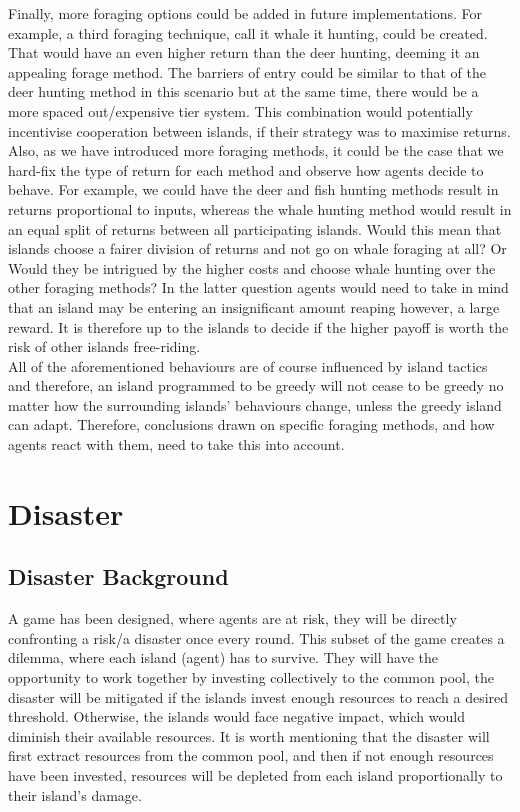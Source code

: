 Finally, more foraging options could be added in future implementations. For example, a third foraging technique, call it whale it hunting, could be created. That would have an even higher return than the deer hunting, deeming it an appealing forage method. The barriers of entry could be similar to that of the deer hunting method in this scenario but at the same time, there would be a more spaced out/expensive tier system. This combination would potentially incentivise cooperation between islands, if their strategy was to maximise returns. Also, as we have introduced more foraging methods, it could be the case that we hard-fix the type of return for each method and observe how agents decide to behave. For example, we could have the deer and fish hunting methods result in returns proportional to inputs, whereas the whale hunting method would result in an equal split of returns between all participating islands. Would this mean that islands choose a fairer division of returns and not go on whale foraging at all? Or Would they be intrigued by the higher costs and choose whale hunting over the other foraging methods? In the latter question agents would need to take in mind that an island may be entering an insignificant amount reaping however, a large reward. It is therefore up to the islands to decide if the higher payoff is worth the risk of other islands free-riding.\\

All of the aforementioned behaviours are of course influenced by island tactics and therefore, an island programmed to be greedy will not cease to be greedy no matter how the surrounding islands’ behaviours change, unless the greedy island can adapt. Therefore, conclusions drawn on specific foraging methods, and how agents react with them, need to take this into account.\\

\section{Disaster}
\subsection{Disaster Background}

A game has been designed, where agents are at risk, they will be directly confronting a risk/a disaster once every round. This subset of the game creates a dilemma, where each island (agent) has to survive. They will have the opportunity to work together by investing collectively to the common pool, the disaster will be mitigated if the islands invest enough resources to reach a desired threshold. Otherwise, the islands would face negative impact, which would diminish their available resources. It is worth mentioning that the disaster will first extract resources from the common pool, and then if not enough resources have been invested, resources will be depleted from each island proportionally to their island’s damage.\\

